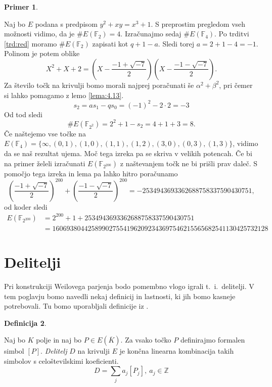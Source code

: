 \documentclass[12pt,a4paper,twoside]{article}
\theoremstyle{definition} %
\newtheorem{definicija}{Definicija}[section]
\newtheorem{primer}[definicija]{Primer}
\theoremstyle{plain} %
\numberwithin{equation}{section}  %
\newcommand{\Z}{\mathbb Z}
\newcommand{\F}{\mathbb F}
\newcommand{\E}[1]{E({#1})}
\begin{document}
\begin{primer}~

Naj bo $E$ podana s predpisom $y^2+xy = x^3+1$. S preprostim pregledom vseh možnosti vidimo, da je $\#\E{\F_2} = 4$. Izračunajmo sedaj $\#\E{\F_4}$. Po trditvi \ref{trd:red} moramo
$\#\E{\F_2}$ zapisati kot $q+1-a$. Sledi torej $a = 2+1-4 = -1$. Polinom je potem oblike
$$X^2+X+2 = (X-\frac{-1+\sqrt{-7}}{2}) (X-\frac{-1-\sqrt{-7}}{2}).$$
Za število točk na krivulji bomo morali najprej poračunati še $\alpha^2+\beta^2$, pri čemer si lahko pomagamo z lemo \ref{lema:4.13}.
$$s_2 = as_1-qs_0 = (-1)^2-2\cdot2 = -3$$
Od tod sledi
$$\#\E{\F_{2^2}} = 2^2+1-s_2 = 4+1+3 = 8.$$
 Če naštejemo vse točke na $\E{\F_{4}} = \{ \infty,(0,1),(1,0),(1,1),(1,2),(3,0),(0,3),(1,3)\}$, vidimo da se naš rezultat ujema.
Moč tega izreka pa se skriva v velikih potencah. Če bi na primer želeli izračunati
$\E{\F_{2^{200}}}$ z naštevanjem točk ne bi prišli prav daleč. S pomočjo tega izreka in lema pa lahko hitro poračunamo
$$(\frac{-1+\sqrt{-7}}{2})^{200}+ (\frac{-1-\sqrt{-7}}{2})^{200} = -2534943693362688758337590430751,$$
od koder sledi
\begin{align}
\E{\F_{2^{200}}} &{}= 2^{200} + 1 +2534943693362688758337590430751 \nonumber \\
&{}= 1606938044258990275541962092343697546215565682541130425732128 \nonumber
\end{align}
\end{primer}

\newpage


\section{Delitelji}

Pri konstrukciji Weilovega parjenja bodo pomembno vlogo igrali t.\ i.\ delitelji. V tem poglavju bomo navedli nekaj definicij in lastnosti, ki jih bomo kasneje potrebovali. Tu bomo uporabljali definicije iz \cite{Washington2008}.

\begin{definicija}~

Naj bo $K$ polje in naj bo $P \in \E{\overline{K}}$. Za vsako točko $P$ definirajmo formalen simbol $[P]$. \emph{Delitelj} $D$ na krivulji $E$ je končna linearna kombinacija takih simbolov s celoštevilskimi koeficienti.
$$D = \sum_{j}a_j[P_j], \ a_j \in \Z $$

\end{definicija}
\end{document}

